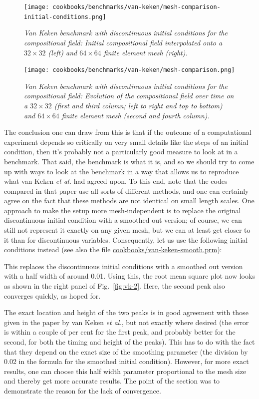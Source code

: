 \documentclass{article}
\begin{document}
\begin{figure}
  \centering
  \texttt{[image: cookbooks/benchmarks/van-keken/mesh-comparison-initial-conditions.png]}
  \caption{\it Van Keken benchmark with discontinuous initial conditions for the
  compositional field:
  Initial compositional field interpolated onto a $32\times 32$ (left) and
  $64\times 64$ finite element mesh (right).}
  \label{fig:vk-3}
\end{figure}

\begin{figure}
  \centering
  \texttt{[image: cookbooks/benchmarks/van-keken/mesh-comparison.png]}
  \caption{\it Van Keken benchmark with discontinuous initial conditions for the
  compositional field:
  Evolution of the compositional field over time on a $32\times 32$ (first and
  third column; left to right and top to bottom) and $64\times 64$ finite
  element mesh (second and fourth column).}
  \label{fig:vk-4}
\end{figure}

The conclusion one can draw from this is that if the outcome of a computational
experiment depends so critically on very small details like the steps of an
initial condition, then it's probably not a particularly good measure to look at
in a benchmark. That said, the benchmark is what it is, and so we should try to
come up with ways to look at the benchmark in a way that allows us to reproduce
what van Keken \textit{et al.} had agreed upon. To this end, note that the codes
compared in that paper use all sorts of different methods, and one can certainly
agree on the fact that these methods are not identical on small length scales.
One approach to make the setup more mesh-independent is to replace the original
discontinuous initial condition with a smoothed out version; of course, we can
still not represent it exactly on any given mesh, but we can at least get closer
to it than for discontinuous variables. Consequently, let us use the following
initial conditions instead (see also the file
\url{cookbooks/van-keken-smooth.prm}):


This replaces the discontinuous initial conditions with a smoothed out version
with a half width of around 0.01. Using this, the root mean square plot now
looks as shown in the right panel of Fig.~\ref{fig:vk-2}. Here, the second peak
also converges quickly, as hoped for.

The exact location and height of the two peaks is in good agreement with those
given in the paper by van Keken \textit{et al.}, but not exactly where desired
(the error is within a couple of per cent for the first peak, and probably
better for the second, for both the timing and height of the peaks).
This has to do with the fact that they depend on the exact size of the smoothing
parameter (the division by 0.02 in the formula for the smoothed initial
condition). However, for more exact results, one can choose
this half width parameter proportional to the mesh size and thereby get more
accurate results. The point of the section was to demonstrate the reason
for the lack of convergence.
\end{document}
